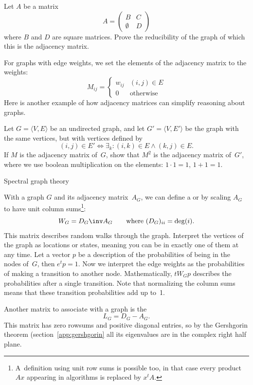 \begin{exercise}
  Let $A$ be a matrix
  \[ A=
  \begin{pmatrix}
    B&C\\ \emptyset&D
  \end{pmatrix}
  \]
  where $B$ and $D$ are square matrices. Prove the reducibility of the
  graph of which this is the adjacency matrix.
\end{exercise}

For graphs with edge weights, we set the elements of the adjacency
matrix to the weights:
\[ 
  M_{ij}=
  \begin{cases}w_{ij}&(i,j)\in E\\ 0&\mbox{otherwise}\end{cases}
\]
Here is another example of how adjacency matrices can simplify
reasoning about graphs.
\begin{exercise}
  Let $G=\langle V,E\rangle$ be an undirected graph, and let $G'=\langle
  V,E'\rangle$ be the graph with the same vertices, but with vertices
  defined by
  \[ (i,j)\in E'\Leftrightarrow \exists_k\colon (i,k)\in E\wedge
  (k,j)\in E. \]
  If $M$ is the adjacency matrix of~$G$, show that $M^2$ is the
  adjacency matrix of~$G'$, where we use boolean multiplication on the
  elements: $1\cdot1=1$, $1+1=1$.
\end{exercise}

 {Spectral graph theory}
\label{app:fiedler}

With a graph $G$ and its adjacency matrix~$A_G$, we can define a
 or  by scaling
$A_G$ to have unit column sums\footnote{A~definition using unit row
  sums is possible too, in that case every product $Ax$ appearing in
  algorithms is replaced by $x^tA$.}:
\[ W_G = D_G\inv A_G\qquad \hbox{where $(D_G)_{ii}=\deg(i)$}. \]
This matrix describes random walks through the graph. Interpret the
vertices of the graph as locations or states, meaning you can be in
exactly one of them at any time. Let a vector
$p$ be a description of the 
probabilities of being in the nodes of~$G$, then $e^tp=1$.
Now we interpret the edge weights as the probabilities of making a
transition to another node. Mathematically,
$tW_Gp$ describes the probabilities after a single transition. Note
that normalizing the column sums means that these transition
probabilities add up to~1.

Another matrix to associate with a graph is the
\[ L_G = D_G-A_G. \]
This matrix has zero rowsums and positive diagonal entries, so by the
Gershgorin theorem (section~\ref{app:gershgorin} all its eigenvalues
are in the complex right half plane. 

